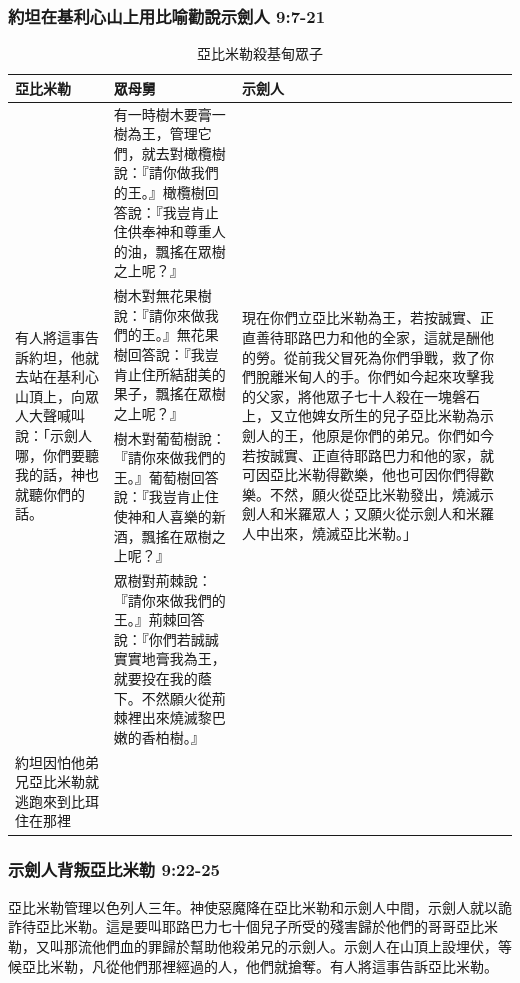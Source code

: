 \subsubsection{約坦在基利心山上用比喻勸說示劍人 9:7-21}    
\begin{table}[H]
\centering
\begin{tabular}{p{2.85cm}|p{}|p{6.2cm}}\hline\hline
亞比米勒&眾母舅&示劍人\\\hline
\multirow{4}{2.85cm}{有人將這事告訴約坦，他就去站在基利心山頂上，向眾人大聲喊叫說：「示劍人哪，你們要聽我的話，神也就聽你們的話。} 
&有一時樹木要膏一樹為王，管理它們，就去對橄欖樹說：『請你做我們的王。』橄欖樹回答說：『我豈肯止住供奉神和尊重人的油，飄搖在眾樹之上呢？』 &\multirow{4}{6.25cm}{現在你們立亞比米勒為王，若按誠實、正直善待耶路巴力和他的全家，這就是酬他的勞。從前我父冒死為你們爭戰，救了你們脫離米甸人的手。你們如今起來攻擊我的父家，將他眾子七十人殺在一塊磐石上，又立他婢女所生的兒子亞比米勒為示劍人的王，他原是你們的弟兄。你們如今若按誠實、正直待耶路巴力和他的家，就可因亞比米勒得歡樂，他也可因你們得歡樂。不然，願火從亞比米勒發出，燒滅示劍人和米羅眾人；又願火從示劍人和米羅人中出來，燒滅亞比米勒。」} \\\cline{2-2}
&樹木對無花果樹說：『請你來做我們的王。』無花果樹回答說：『我豈肯止住所結甜美的果子，飄搖在眾樹之上呢？』&\\\cline{2-2}
&樹木對葡萄樹說：『請你來做我們的王。』葡萄樹回答說：『我豈肯止住使神和人喜樂的新酒，飄搖在眾樹之上呢？』&\\\cline{2-2}
&眾樹對荊棘說：『請你來做我們的王。』荊棘回答說：『你們若誠誠實實地膏我為王，就要投在我的蔭下。不然願火從荊棘裡出來燒滅黎巴嫩的香柏樹。』 &\\\hline
約坦因怕他弟兄亞比米勒就逃跑來到比珥住在那裡&&\\\hline
 \end{tabular}
\caption{亞比米勒殺基甸眾子}
\end{table}  


\subsubsection{示劍人背叛亞比米勒 9:22-25}
亞比米勒管理以色列人三年。神使惡魔降在亞比米勒和示劍人中間，示劍人就以詭詐待亞比米勒。這是要叫耶路巴力七十個兒子所受的殘害歸於他們的哥哥亞比米勒，又叫那流他們血的罪歸於幫助他殺弟兄的示劍人。示劍人在山頂上設埋伏，等候亞比米勒，凡從他們那裡經過的人，他們就搶奪。有人將這事告訴亞比米勒。

